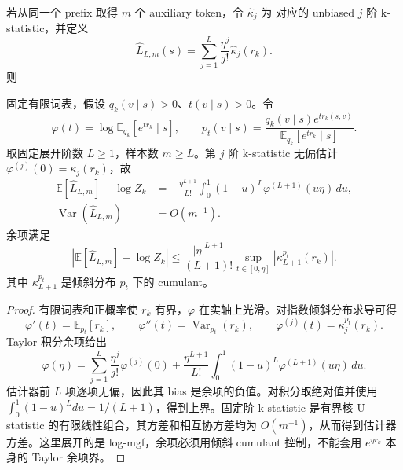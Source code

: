 \documentclass[lang=cn,scheme=chinese,openany]{../book/elegantbook}
\begin{document}
若从同一个 prefix 取得 $m$ 个 auxiliary token，令 $\widehat\kappa_j$ 为 对应的 unbiased $j$ 阶 k-statistic，并定义
\begin{equation}
\widehat L_{L,m}(s)=\sum_{j=1}^{L}\frac{\eta^j}{j!}\widehat\kappa_j(r_k).
\label{eq:ch2-opd-logz-kstat-estimator}
\end{equation}
则
\begin{theorem}
\label{thm:ch2-opd-logz-cumulant}
固定有限词表，假设 $q_k(v\mid s)>0$、$t(v\mid s)>0$。令
\begin{equation}
\varphi(t)=\log\mathbb E_{q_k}[e^{t r_k}\mid s],\qquad
p_t(v\mid s)=\frac{q_k(v\mid s)e^{t r_k(s,v)}}{\mathbb E_{q_k}[e^{t r_k}\mid s]}.
\end{equation}
取固定展开阶数 $L\ge1$，样本数 $m\ge L$。第 $j$ 阶 k-statistic 无偏估计 $\varphi^{(j)}(0)=\kappa_j(r_k)$，故
\begin{align}
\mathbb E[\widehat L_{L,m}]-\log Z_k
&=-\frac{\eta^{L+1}}{L!}\int_0^1(1-u)^L\varphi^{(L+1)}(u\eta)\,du,\\
\operatorname{Var}(\widehat L_{L,m})&=O(m^{-1}).
\end{align}
余项满足
\begin{equation}
\left|\mathbb E[\widehat L_{L,m}]-\log Z_k\right|
\le\frac{|\eta|^{L+1}}{(L+1)!}\sup_{t\in[0,\eta]}\left|\kappa_{L+1}^{p_t}(r_k)\right|.
\end{equation}
其中 $\kappa_{L+1}^{p_t}$ 是倾斜分布 $p_t$ 下的 cumulant。
\end{theorem}
\begin{proof}
有限词表和正概率使 $r_k$ 有界，$\varphi$ 在实轴上光滑。对指数倾斜分布求导可得
\begin{equation}
\varphi'(t)=\mathbb E_{p_t}[r_k],\qquad
\varphi''(t)=\operatorname{Var}_{p_t}(r_k),\qquad
\varphi^{(j)}(t)=\kappa_j^{p_t}(r_k).
\end{equation}
Taylor 积分余项给出
\begin{equation}
\varphi(\eta)=\sum_{j=1}^{L}\frac{\eta^j}{j!}\varphi^{(j)}(0)
+\frac{\eta^{L+1}}{L!}\int_0^1(1-u)^L\varphi^{(L+1)}(u\eta)\,du.
\end{equation}
估计器前 $L$ 项逐项无偏，因此其 bias 是余项的负值。对积分取绝对值并使用 $\int_0^1(1-u)^Ldu=1/(L+1)$，得到上界。固定阶 k-statistic 是有界核 U-statistic 的有限线性组合，其方差和相互协方差均为 $O(m^{-1})$，从而得到估计器方差。这里展开的是 log-mgf，余项必须用倾斜 cumulant 控制，不能套用 $e^{\eta r_k}$ 本身的 Taylor 余项界。
\end{proof}
\end{document}
